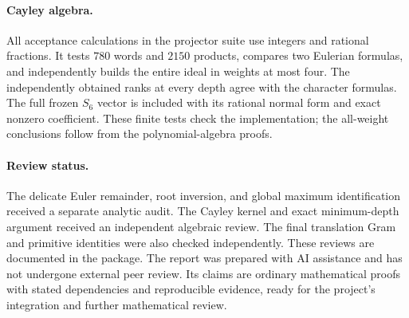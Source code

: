 \paragraph{Cayley algebra.}
All acceptance calculations in the projector suite use integers and
rational fractions. It tests $780$ words and $2150$ products, compares
two Eulerian formulas, and independently builds the entire ideal in
weights at most four. The independently obtained ranks at every depth
agree with the character formulas. The full frozen $S_6$ vector is
included with its rational normal form and exact nonzero coefficient.
These finite tests check the implementation; the all-weight
conclusions follow from the polynomial-algebra proofs.

\paragraph{Review status.}
The delicate Euler remainder, root inversion, and global maximum
identification received a separate analytic audit. The Cayley kernel
and exact minimum-depth argument received an independent algebraic
review. The final translation Gram and primitive identities were also
checked independently. These reviews are documented in the package.
The report was prepared with AI assistance and has not undergone
external peer review. Its claims are ordinary mathematical proofs
with stated dependencies and reproducible evidence, ready for the
project's integration and further mathematical review.

